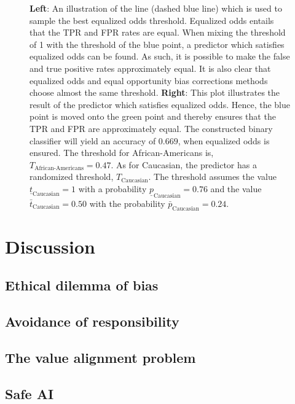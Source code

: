 \documentclass[11pt, fleqn, titlepage]{article}
\begin{document}
\begin{figure}[H]
		\caption{\textbf{Left}: An illustration of the line (dashed blue line) which is used to sample the best equalized odds threshold. Equalized odds entails that the TPR and FPR rates are equal. When mixing the threshold of 1 with the threshold of the blue point, a predictor which satisfies equalized odds can be found. As such, it is possible to make the false and true positive rates approximately equal. It is also clear that equalized odds and equal opportunity bias corrections methods choose almost the same threshold.  \textbf{Right}: This plot illustrates the result of the predictor which satisfies equalized odds. Hence, the blue point is moved onto the green point and thereby ensures that the TPR and FPR are approximately equal. The constructed binary classifier will yield an accuracy of $ 0.669 $, when equalized odds is ensured. The threshold for African-Americans is, $ T_{\text{African-Americans}} = 0.47 $. As for Caucasian, the predictor has a randomized threshold, $ T_{\text{Caucasian}} $. The threshold assumes the value $\underline t_{\text{Caucasian}} = 1 $  with a probability $ \underline p_{\text{Caucasian}}= 0.76 $ and the value $ \bar t_{\text{Caucasian}} = 0.50 $ with the probability $\bar p_{\text{Caucasian}} = 0.24 $.}
	\end{figure}
	
	\section{Discussion} \label{discussion}
	
	
	
	\subsection{Ethical dilemma of bias}
	
	\subsection{Avoidance of responsibility}

	\subsection{The value alignment problem}
	
	\subsection{Safe AI}
		
\end{document}
